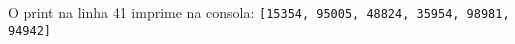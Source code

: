 \documentclass[12pt,varwidth=16cm,border=1pt]{standalone}
\begin{document}
O print na linha 41 imprime na consola:
\newline
\verb+[15354, 95005, 48824, 35954, 98981, 94942]+
\end{document}
